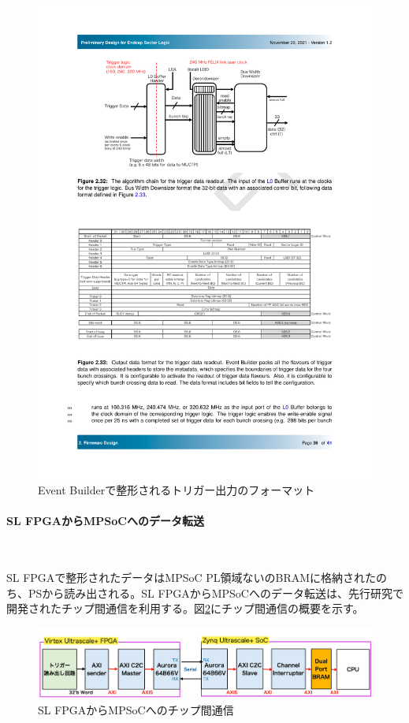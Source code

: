 \begin{itemize}
    \begin{figure} 
    \centering
    \includegraphics[width=16cm]{fig/Test/TriggerReadout_format.pdf}
    \caption[Event Builderで整形されるトリガー出力のフォーマット]{Event Builderで整形されるトリガー出力のフォーマット\cite{SLPDR}}
    \label{TriggerReadout_format}
    \end{figure}
\end{itemize}

\paragraph{SL FPGAからMPSoCへのデータ転送}　　
\par
SL FPGAで整形されたデータはMPSoC PL領域ないのBRAMに格納されたのち、PSから読み出される。SL FPGAからMPSoCへのデータ転送は、先行研究で開発されたチップ間通信を利用する。図\ref{C2C}にチップ間通信の概要を示す。
\begin{figure} 
\centering
\includegraphics[width=16cm]{fig/Test/C2C.png}
\caption[SL FPGAからMPSoCへのチップ間通信]{SL FPGAからMPSoCへのチップ間通信}
\label{C2C}
\end{figure}

